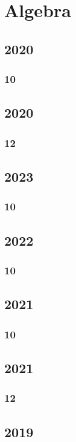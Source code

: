 \documentclass[11pt]{book}
\begin{document}
\chapter{Algebra}
\section{2020}
\subsection{10}

\section{2020}
\subsection{12}

\section{2023}
\subsection{10}

\section{2022}
\subsection{10}

\section{2021}
\subsection{10}



\section{2021}
\subsection{12}


\section{2019}
\end{document}
